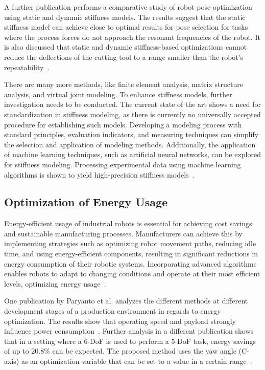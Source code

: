 A further publication performs a comparative study of robot pose optimization using static and dynamic stiffness models. The results suggest that the static stiffness model can achieve close to optimal results for pose selection for tasks where the process forces do not approach the resonant frequencies of the robot. It is also discussed that static and dynamic stiffness-based optimizations cannot reduce the deflections of the cutting tool to a range smaller than the robot's repeatability~\cite{Cvitanic.2020}.

There are many more methods, like finite element analysis, matrix structure analysis, and virtual joint modeling. 
To enhance stiffness models, further investigation needs to be conducted. The current state of the art shows a need for standardization in stiffness modeling, as there is currently no universally accepted procedure for establishing such models. Developing a modeling process with standard principles, evaluation indicators, and measuring techniques can simplify the selection and application of modeling methods. Additionally, the application of machine learning techniques, such as artificial neural networks, can be explored for stiffness modeling. Processing experimental data using machine learning algorithms is shown to yield high-precision stiffness models~\cite{Wu.2022}.

\subsection{Optimization of Energy Usage}
Energy-efficient usage of industrial robots is essential for achieving cost savings and sustainable manufacturing processes. Manufacturers can achieve this by implementing strategies such as optimizing robot movement paths, reducing idle time, and using energy-efficient components, resulting in significant reductions in energy consumption of their robotic systems. Incorporating advanced algorithms enables robots to adapt to changing conditions and operate at their most efficient levels, optimizing energy usage~\cite{Uhlmann.2016}. 

One publication by  Paryanto et al. analyzes the different methods at different development stages of a production environment in regards to energy optimization. The results show that operating speed and payload strongly influence power consumption~\cite{Paryanto.2015}. Further analysis in a different publication shows that in a setting where a 6-\acrshort{DoF} is used to perform a 5-\acrshort{DoF} task, energy savings of up to 20.8\% can be expected. The proposed method uses the yaw angle (C-axis) as an optimization variable that can be set to a value in a certain range~\cite{Boscariol.2020}. 

